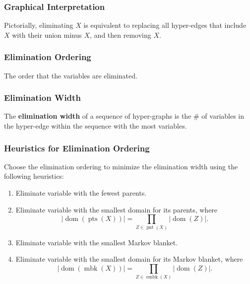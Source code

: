 \subsubsection{Graphical Interpretation}
\begin{definition}
    Pictorially, eliminating $X$ is equivalent to replacing all hyper-edges that include $X$ with their union minus $X$, and then removing $X$.
\end{definition}

\subsubsection{Elimination Ordering}
\begin{definition}
    The order that the variables are eliminated.
\end{definition}

\subsubsection{Elimination Width}
\begin{definition}
    The \textbf{elimination width} of a sequence of hyper-graphs is the \# of variables in the hyper-edge within the sequence with the most variables.
\end{definition}

\subsubsection{Heuristics for Elimination Ordering}
\begin{definition}
    Choose the elimination ordering to minimize the elimination width using the following heuristics:
    \begin{enumerate}
        \item Eliminate variable with the fewest parents.
        \item Eliminate variable with the smallest domain for its parents, where
        \[
        |\operatorname{dom}(\operatorname{pts}(X))| = \prod_{Z \in \operatorname{pnt}(X)} |\operatorname{dom}(Z)|.
        \]
        \item Eliminate variable with the smallest Markov blanket.
        \item Eliminate variable with the smallest domain for its Markov blanket, where
        \[
        |\operatorname{dom}(\operatorname{mbk}(X))| = \prod_{Z \in \operatorname{embk}(X)} |\operatorname{dom}(Z)|.
        \]
    \end{enumerate}
\end{definition}
\newpage

